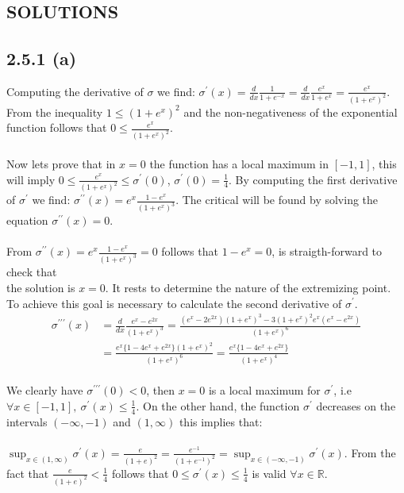 \documentclass{exam}
\begin{document}
\newpage

\begin{center}    
    \section*{SOLUTIONS}
\end{center}

\subsection*{2.5.1 (a)}
Computing the derivative of $\sigma$ we find: $\sigma^\prime(x) = \frac{d}{dx} \frac{1}{ 1 + e^{-x}} = \frac{d}{dx} \frac{e^x}{ 1 + e^{x}} = \frac{e^x}{(1 + e^{x})^2}$. From the inequality $1 \leq (1+e^x)^2$ and the non-negativeness of the exponential function follows that 
$0 \leq \frac{e^x}{(1 + e^{x})^2}$. \\
\\
Now lets prove that in $x=0$ the function has a local maximum in $[-1,1]$, this will imply $0 \leq \frac{e^x}{(1 + e^{x})^2} \leq \sigma^\prime(0)$, $\sigma^\prime(0) = \frac{1}{4}$. By computing the first derivative of $\sigma^\prime$ we find: 
$\sigma^{\prime\prime}(x) = e^{x}\frac{1-e^{x}}{(1 + e^{x})^3}$. The critical will be found by solving the equation $\sigma^{\prime\prime}(x) = 0$. \\
\\
From $\sigma^{\prime\prime}(x) = e^{x}\frac{1-e^{x}}{(1 + e^{x})^3} = 0$ follows that $1 - e^x = 0$, is straigth-forward to check that \\
the solution is $x=0$. It rests to determine the nature of the extremizing point. To achieve this goal is necessary to calculate the second derivative of $\sigma^{\prime}$.
\begin{equation*}     
        \begin{aligned}
            \sigma^{\prime\prime\prime}(x) &= \frac{d}{ d x} \frac{e^{x}-e^{2x}}{(1 + e^{x})^3} = \frac{(e^x - 2e^{2x})(1 + e^x)^3 - 3(1 + e^x)^2 e^{x}(e^x - e^{2x})}{(1 + e^x)^6}\\
            &= \frac{e^{x} \{ 1 - 4e^x + e^{2x} \}(1 + e^x)^2}{(1 + e^x)^{6}} = \frac{e^{x} \{ 1 - 4e^x + e^{2x} \}}{(1 + e^x)^{4}}
        \end{aligned}
\end{equation*}
\\
We clearly have $\sigma^{\prime\prime\prime}(0) < 0$, then $x = 0$ is a local maximum for $\sigma^\prime$, i.e $\forall x \in [-1, 1], \ \sigma^\prime(x) \leq \frac{1}{4}$. On the other hand,
the function $\sigma^\prime$ decreases on the intervals $(-\infty,-1)$ and $(1, \infty)$ this implies that:\\
\\
$\displaystyle\sup_{x \in (1,\infty)}\sigma^{\prime}(x) = \displaystyle\frac{e}{(1 + e)^2} = \displaystyle\frac{e^{-1}}{(1 + e^{-1})^2} = \sup_{x \in (-\infty,-1)} \sigma^{\prime}(x)$.
From the fact that $\displaystyle\frac{e}{(1 + e)^2} < \frac{1}{4}$ follows that $ 0 \leq \sigma^\prime(x) \leq \frac{1}{4}$ is valid $\forall x \in \mathbb{R}$. 
\end{document}
